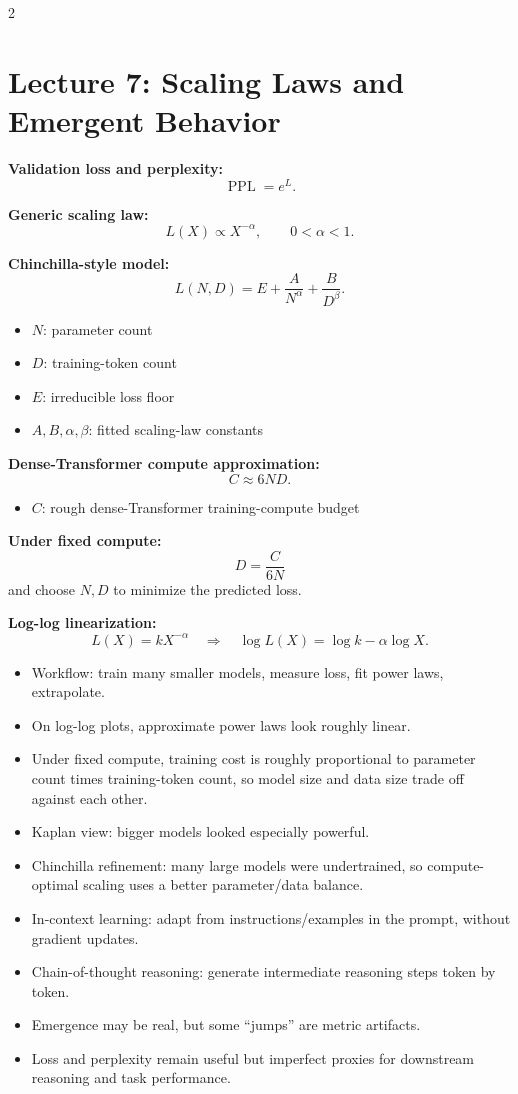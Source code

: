 \documentclass[10pt]{article}
\newcommand{\PPL}{\operatorname{PPL}}
\newenvironment{symdefs}{\begin{itemize}[leftmargin=1.1em, topsep=1pt, itemsep=0pt, parsep=0pt]}{\end{itemize}}
\newcommand{\sym}[2]{\item \textbf{#1}: #2}
\begin{document}
\begin{multicols*}{2}
\section*{Lecture 7: Scaling Laws and Emergent Behavior}
\textbf{Validation loss and perplexity:}
\[
\PPL=e^{L}.
\]

\textbf{Generic scaling law:}
\[
L(X)\propto X^{-\alpha},
\qquad 0<\alpha<1.
\]

\textbf{Chinchilla-style model:}
\[
L(N,D)=E+\frac{A}{N^\alpha}+\frac{B}{D^\beta}.
\]
\begin{symdefs}
\sym{\(N\)}{parameter count}
\sym{\(D\)}{training-token count}
\sym{\(E\)}{irreducible loss floor}
\sym{\(A,B,\alpha,\beta\)}{fitted scaling-law constants}
\end{symdefs}

\textbf{Dense-Transformer compute approximation:}
\[
C \approx 6ND.
\]
\begin{symdefs}
\sym{\(C\)}{rough dense-Transformer training-compute budget}
\end{symdefs}

\textbf{Under fixed compute:}
\[
D=\frac{C}{6N}
\]
and choose \(N,D\) to minimize the predicted loss.

\textbf{Log-log linearization:}
\[
L(X)=kX^{-\alpha}
\quad \Longrightarrow \quad
\log L(X)=\log k - \alpha \log X.
\]

\begin{itemize}
\item Workflow: train many smaller models, measure loss, fit power laws, extrapolate.
\item On log-log plots, approximate power laws look roughly linear.
\item Under fixed compute, training cost is roughly proportional to parameter count times training-token count, so model size and data size trade off against each other.
\item Kaplan view: bigger models looked especially powerful.
\item Chinchilla refinement: many large models were undertrained, so compute-optimal scaling uses a better parameter/data balance.
\item In-context learning: adapt from instructions/examples in the prompt, without gradient updates.
\item Chain-of-thought reasoning: generate intermediate reasoning steps token by token.
\item Emergence may be real, but some ``jumps'' are metric artifacts.
\item Loss and perplexity remain useful but imperfect proxies for downstream reasoning and task performance.
\end{itemize}


\end{multicols*}
\end{document}
